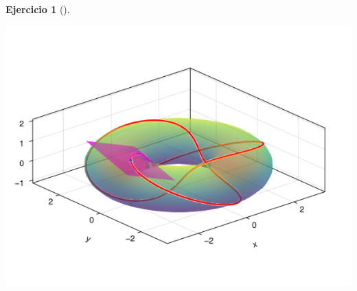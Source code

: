 \documentclass[
  a4paper,
]{scrreport}
\theoremstyle{definition}
\newtheorem{exercise}{Ejercicio}[chapter]
\theoremstyle{remark}
\begin{document}
\begin{exercise}[]
\begin{tcolorbox}
\includegraphics{08-funciones-vectoriales_files/figure-pdf/cell-18-output-2.png}

\end{tcolorbox}

\end{exercise}
\end{document}
